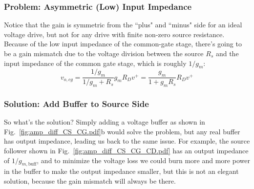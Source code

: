 



\subsubsection{Problem:  Asymmetric (Low) Input Impedance}


Notice that the gain is symmetric from the ``plus" and ``minus" side for an ideal voltage drive, but not for any drive with finite non-zero source resistance.  Because of the low input impedance of the common-gate stage, there's going to be a gain mismatch due to the voltage division between the source $R_s$ and the input impedance of the common gate stage, which is roughly $1/g_m$:
%
\begin{equation}
	v_{o,cg} = \frac{1/g_m}{1/g_m + R_s} g_m R_D  v^+ = \frac{g_m}{1 + g_m R_s}  R_D  v^+
\end{equation} 
%

\subsubsection{Solution:  Add Buffer to Source Side}

So what's the solution? Simply adding a voltage buffer as shown in Fig.~\ref{fig:amp_diff_CS_CG.pdf}b would solve the problem, but any real buffer has output impedance, leading us back to the same issue.  For example, the source follower shown in Fig.~\ref{fig:amp_diff_CS_CG_CD.pdf} has an output impedance of $1/g_{m,\text{buff}}$, and to minimize the voltage loss we could burn more and more power in the buffer to make the output impedance smaller, but this is not an elegant solution, because the gain mismatch will always be there.




